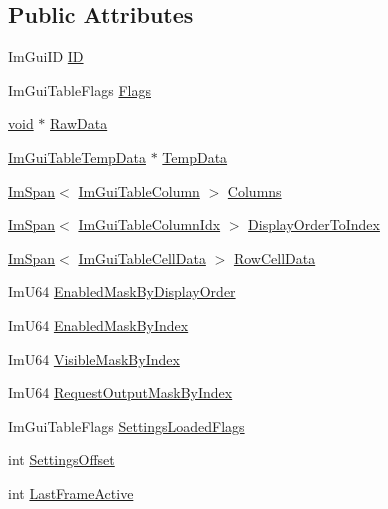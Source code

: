 \subsection*{Public Attributes}
\begin{DoxyCompactItemize}
\item 
Im\+Gui\+ID \hyperlink{structImGuiTable_a1f7e5dd488328d3a78de80e7ccc64036}{ID}
\item 
Im\+Gui\+Table\+Flags \hyperlink{structImGuiTable_ac232807fd66991e640579fb3b02ae051}{Flags}
\item 
\hyperlink{imgui__impl__opengl3__loader_8h_ac668e7cffd9e2e9cfee428b9b2f34fa7}{void} $\ast$ \hyperlink{structImGuiTable_a7e661eeaca53f374216bf0f45dff29e4}{Raw\+Data}
\item 
\hyperlink{structImGuiTableTempData}{Im\+Gui\+Table\+Temp\+Data} $\ast$ \hyperlink{structImGuiTable_a89db69966920e938cdf67f23164c3a80}{Temp\+Data}
\item 
\hyperlink{structImSpan}{Im\+Span}$<$ \hyperlink{structImGuiTableColumn}{Im\+Gui\+Table\+Column} $>$ \hyperlink{structImGuiTable_a6b39e1812dd524fe2dd4a04b613588cf}{Columns}
\item 
\hyperlink{structImSpan}{Im\+Span}$<$ \hyperlink{imgui__internal_8h_abe1882c8292cd23a77a54eda2407f147}{Im\+Gui\+Table\+Column\+Idx} $>$ \hyperlink{structImGuiTable_a4fca96eb35902fcfa166694087814edd}{Display\+Order\+To\+Index}
\item 
\hyperlink{structImSpan}{Im\+Span}$<$ \hyperlink{structImGuiTableCellData}{Im\+Gui\+Table\+Cell\+Data} $>$ \hyperlink{structImGuiTable_a686734156d60378e2c792c93b554d327}{Row\+Cell\+Data}
\item 
Im\+U64 \hyperlink{structImGuiTable_a48a3e6385222c39b4aff0981ccab7e9e}{Enabled\+Mask\+By\+Display\+Order}
\item 
Im\+U64 \hyperlink{structImGuiTable_a4847a140fb04dbf6446432a720764728}{Enabled\+Mask\+By\+Index}
\item 
Im\+U64 \hyperlink{structImGuiTable_a7c13f14fa0933b15a4430123f49acb05}{Visible\+Mask\+By\+Index}
\item 
Im\+U64 \hyperlink{structImGuiTable_af7746ea46154a9055dd467922dcc3c0c}{Request\+Output\+Mask\+By\+Index}
\item 
Im\+Gui\+Table\+Flags \hyperlink{structImGuiTable_a099a9fc8ad83bf0338221463848315b2}{Settings\+Loaded\+Flags}
\item 
int \hyperlink{structImGuiTable_af300d599c6b3ff9e43ee714da21aac1d}{Settings\+Offset}
\item 
int \hyperlink{structImGuiTable_a6be35e3ea6e5ae9f63949f86aa2a6216}{Last\+Frame\+Active}

\end{DoxyCompactItemize}
